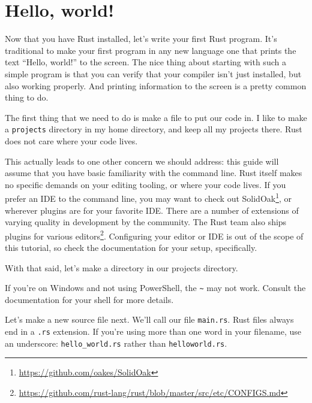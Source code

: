 \documentclass[a4paper,]{book}
\newenvironment{Shaded}{\begin{snugshade}}{\end{snugshade}}
\newcommand{\KeywordTok}[1]{\textcolor[rgb]{0.13,0.29,0.53}{\textbf{{#1}}}}
\newcommand{\NormalTok}[1]{{#1}}
\renewcommand{\href}[2]{#2\footnote{\url{#1}}}
\begin{document}
\section{Hello, world!}\label{sec--hello-world}

Now that you have Rust installed, let's write your first Rust program.
It's traditional to make your first program in any new language one that
prints the text ``Hello, world!'' to the screen. The nice thing about
starting with such a simple program is that you can verify that your
compiler isn't just installed, but also working properly. And printing
information to the screen is a pretty common thing to do.

The first thing that we need to do is make a file to put our code in. I
like to make a \texttt{projects} directory in my home directory, and
keep all my projects there. Rust does not care where your code lives.

This actually leads to one other concern we should address: this guide
will assume that you have basic familiarity with the command line. Rust
itself makes no specific demands on your editing tooling, or where your
code lives. If you prefer an IDE to the command line, you may want to
check out \href{https://github.com/oakes/SolidOak}{SolidOak}, or
wherever plugins are for your favorite IDE. There are a number of
extensions of varying quality in development by the community. The Rust
team also ships
\href{https://github.com/rust-lang/rust/blob/master/src/etc/CONFIGS.md}{plugins
for various editors}. Configuring your editor or IDE is out of the scope
of this tutorial, so check the documentation for your setup,
specifically.

With that said, let's make a directory in our projects directory.

\begin{Shaded}
\end{Shaded}

If you're on Windows and not using PowerShell, the
\texttt{\textasciitilde{}} may not work. Consult the documentation for
your shell for more details.

Let's make a new source file next. We'll call our file \texttt{main.rs}.
Rust files always end in a \texttt{.rs} extension. If you're using more
than one word in your filename, use an underscore:
\texttt{hello\_world.rs} rather than \texttt{helloworld.rs}.
\end{document}

